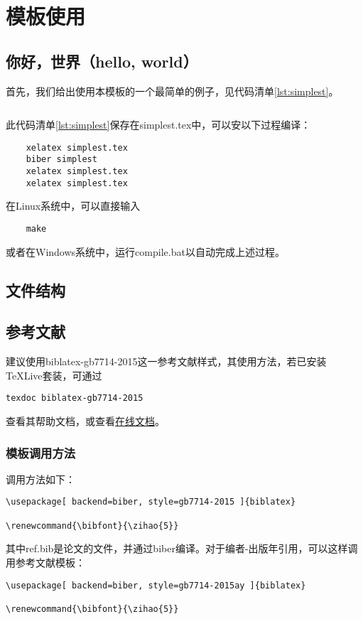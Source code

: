 \documentclass[oneside]{LZU}
\renewcommand{\bibfont}{\zihao{5}}
\newcommand{\filename}[1]{{\ttfamily #1}}
\newcommand{\package}[1]{{\sffamily #1}}
\begin{document}
\chapter{模板使用}
\section{你好，世界（hello, world）}
首先，我们给出使用本模板的一个最简单的例子，见代码清单\ref{lst:simplest}。

\begingroup
    \label{lst:simplest}
    \inputminted[breaklines,frame=single,linenos]{latex}{simplest.tex}
\endgroup
此代码清单\ref{lst:simplest}保存在\filename{simplest.tex}中，可以安以下过程编译：
\begin{verbatim}
    xelatex simplest.tex
    biber simplest
    xelatex simplest.tex
    xelatex simplest.tex
\end{verbatim}
在Linux系统中，可以直接输入
\begin{verbatim}
    make
\end{verbatim}
或者在Windows系统中，运行\filename{compile.bat}以自动完成上述过程。

\section{文件结构}
\section{参考文献}
建议使用\package{biblatex-gb7714-2015}这一参考文献样式，其使用方法，若已安装
TeXLive套装，可通过
\begin{verbatim}
texdoc biblatex-gb7714-2015
\end{verbatim}
查看其帮助文档，或查看\href{https://ctan.org/pkg/biblatex-gb7714-2015}{在线文档}。
\subsection{模板调用方法}
调用方法如下：
\begin{verbatim}
\usepackage[ backend=biber, style=gb7714-2015 ]{biblatex}

\renewcommand{\bibfont}{\zihao{5}}
\end{verbatim}
其中\filename{ref.bib}是论文的文件，并通过biber\autocite{biber}编译。对于编者-出版年引用，可以这样调用参考文献模板：
\begin{verbatim}
\usepackage[ backend=biber, style=gb7714-2015ay ]{biblatex}

\renewcommand{\bibfont}{\zihao{5}}
\end{verbatim}
\end{document}
